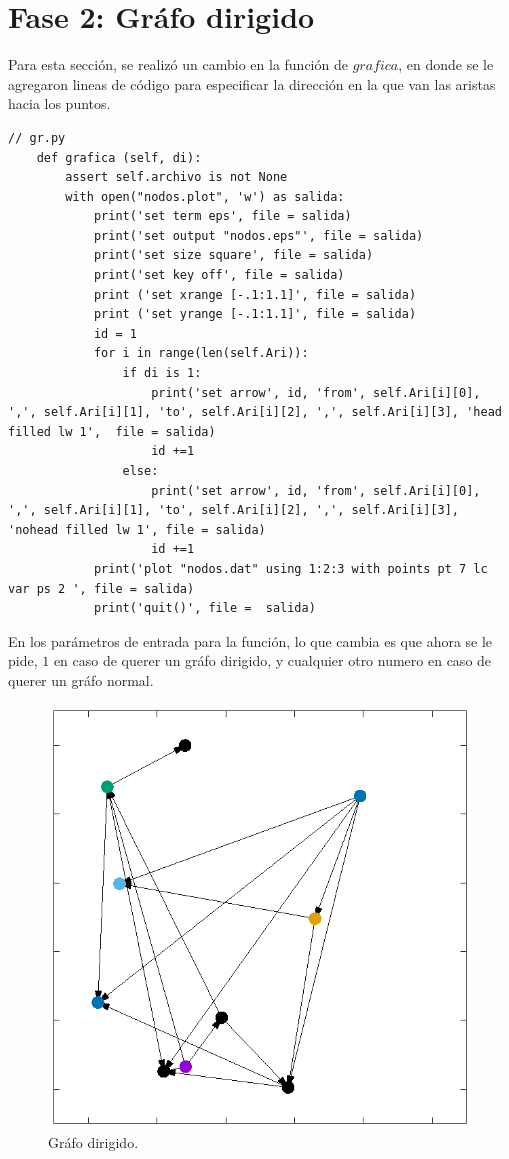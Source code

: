 \documentclass{article}%
\begin{document}
\section*{Fase 2: Gr\'afo dirigido}

Para esta secci\'on, se realiz\'o un cambio en la funci\'on de $grafica$, en donde se le agregaron lineas de c\'odigo para especificar la direcci\'on en la que van las aristas hacia los puntos.

\begin{lstlisting}
// gr.py
	def grafica (self, di):
		assert self.archivo is not None
		with open("nodos.plot", 'w') as salida: 
			print('set term eps', file = salida)
			print('set output "nodos.eps"', file = salida)
			print('set size square', file = salida)
			print('set key off', file = salida)
			print ('set xrange [-.1:1.1]', file = salida)
			print ('set yrange [-.1:1.1]', file = salida)
			id = 1
			for i in range(len(self.Ari)):
				if di is 1:
					print('set arrow', id, 'from', self.Ari[i][0], ',', self.Ari[i][1], 'to', self.Ari[i][2], ',', self.Ari[i][3], 'head filled lw 1',  file = salida)
					id +=1
				else:
					print('set arrow', id, 'from', self.Ari[i][0], ',', self.Ari[i][1], 'to', self.Ari[i][2], ',', self.Ari[i][3], 'nohead filled lw 1', file = salida)
					id +=1
			print('plot "nodos.dat" using 1:2:3 with points pt 7 lc var ps 2 ', file = salida)
			print('quit()', file =  salida)
\end{lstlisting}

En los par\'ametros de entrada para la funci\'on, lo que cambia es que ahora se le pide, $1$ en caso de querer un gr\'afo dirigido, y cualquier otro numero en caso de querer un gr\'afo normal. 

\begin{figure}[h]

\centering
\includegraphics[width = 1\textwidth]{nodo2.eps}
\caption{Gr\'afo dirigido.}
\end{figure}
\end{document}

